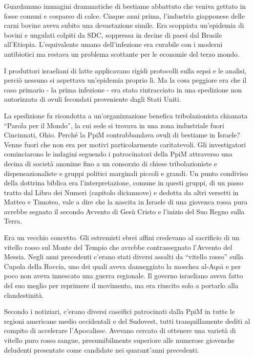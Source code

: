Guardammo immagini drammatiche di bestiame abbattuto che veniva gettato
in fosse comuni e cosparso di calce. Cinque anni prima, l'industria
giapponese delle carni bovine aveva subito una devastazione simile. Era
scoppiata un'epidemia di bovini e ungulati colpiti da SDC, soppressa in
decine di paesi dal Brasile all'Etiopia. L'equivalente umano
dell'infezione era curabile con i moderni antibiotici ma restava un
problema scottante per le economie del terzo mondo.

I produttori israeliani di latte applicavano rigidi protocolli sulla
sepsi e le analisi, perciò nessuno si aspettava un'epidemia proprio lì.
Ma la cosa peggiore era che il caso primario - la prima infezione - era
stato rintracciato in una spedizione non autorizzata di ovuli fecondati
proveniente dagli Stati Uniti.

La spedizione fu ricondotta a un'organizzazione benefica tribolazionista
chiamata ``Parola per il Mondo'', la cui sede si trovava in una zona
industriale fuori Cincinnati, Ohio. Perché la PpiM contrabbandava ovuli
di bestiame in Israele? Venne fuori che non era per motivi
particolarmente caritatevoli. Gli investigatori cominciarono le indagini
seguendo i patrocinatori della PpiM attraverso una decina di società
anonime fino a un consorzio di chiese tribolazioniste e
dispensazionaliste e gruppi politici marginali piccoli e grandi. Un
punto condiviso della dottrina biblica era l'interpretazione, comune in
questi gruppi, di un passo tratto dal Libro dei Numeri (capitolo
diciannove) e dedotta da altri versetti in Matteo e Timoteo, vale a dire
che la nascita in Israele di una giovenca rossa pura avrebbe segnato il
secondo Avvento di Gesù Cristo e l'inizio del Suo Regno sulla Terra.

Era un vecchio concetto. Gli estremisti ebrei affini credevano al
sacrificio di un vitello rosso sul Monte del Tempio che avrebbe
contrassegnato l'Avvento del Messia. Negli anni precedenti c'erano stati
diversi assalti da ``vitello rosso'' sulla Cupola della Roccia, uno dei
quali aveva danneggiato la moschea al-Aqsā e per poco non aveva
innescato una guerra regionale. Il governo israeliano aveva fatto del
suo meglio per reprimere il movimento, ma era riuscito solo a portarlo
alla clandestinità.

Secondo i notiziari, c'erano diversi caseifici patrocinati dalla PpiM in
tutte le regioni americane medio occidentali e del Sudovest, tutti
tranquillamente dediti al compito di accelerare l'Apocalisse. Avevano
cercato di ottenere una varietà di vitello puro rosso sangue,
presumibilmente superiore alle numerose giovenche deludenti presentate
come candidate nei quarant'anni precedenti.


